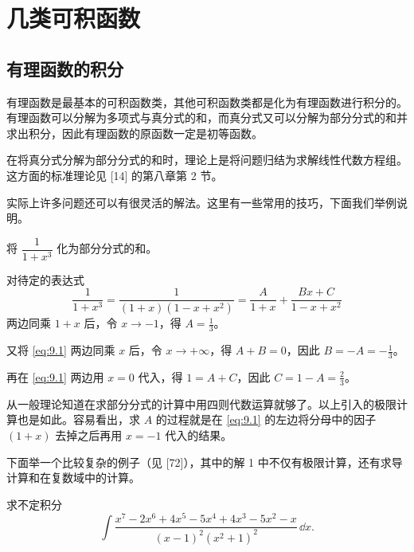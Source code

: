 \section{几类可积函数}

\subsection{有理函数的积分}

有理函数是最基本的可积函数类，其他可积函数类都是化为有理函数进行积分的。有理函数可以分解为多项式与真分式的和，而真分式又可以分解为部分分式的和并求出积分，因此有理函数的原函数一定是初等函数。

在将真分式分解为部分分式的和时，理论上是将问题归结为求解线性代数方程组。这方面的标准理论见 [14] 的第八章第 2 节。

实际上许多问题还可以有很灵活的解法。这里有一些常用的技巧，下面我们举例说明。

\begin{xexample}[9.2.1]
将 $\dfrac1{1+x^3}$ 化为部分分式的和。
\end{xexample}

\begin{xsolution}
对待定的表达式
\begin{equation}
  \frac1{1+x^3}
  =\frac1{(1+x)(1-x+x^2)}
  =\frac{A}{1+x}+\frac{Bx+C}{1-x+x^2}
  \tag{9.1}
  \label{eq:9.1}
\end{equation}
两边同乘 $1+x$ 后，令 $x\to-1$，得 $A=\frac13$。

又将 \eqref{eq:9.1} 两边同乘 $x$ 后，令 $x\to+\infty$，得 $A+B=0$，因此 $B=-A=-\frac13$。

再在 \eqref{eq:9.1} 两边用 $x=0$ 代入，得 $1=A+C$，因此 $C=1-A=\frac23$。
\end{xsolution}

\begin{xremark}
从一般理论知道在求部分分式的计算中用四则代数运算就够了。以上引入的极限计算也是如此。容易看出，求 $A$ 的过程就是在 \eqref{eq:9.1} 的左边将分母中的因子 $(1+x)$ 去掉之后再用 $x=-1$ 代入的结果。
\end{xremark}

下面举一个比较复杂的例子（见 [72]），其中的解 1 中不仅有极限计算，还有求导计算和在复数域中的计算。

\begin{xexample}[9.2.2]
求不定积分
\[
  \int\frac{x^7-2x^6+4x^5-5x^4+4x^3-5x^2-x}{(x-1)^2(x^2+1)^2}\,\dd x.
\]
\end{xexample}

